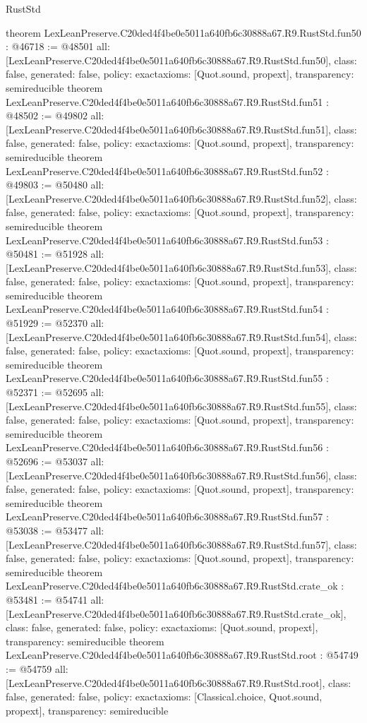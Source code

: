 \begin{lexlean}{RustStd}
\begin{coremodule}
{}
theorem LexLeanPreserve.C20ded4f4be0e5011a640fb6c30888a67.R9.RustStd.fun50 : @46718 := @48501 {
  all: [LexLeanPreserve.C20ded4f4be0e5011a640fb6c30888a67.R9.RustStd.fun50],
  class: false,
  generated: false,
  policy: exact{axioms: [Quot.sound, propext]},
  transparency: semireducible
}
theorem LexLeanPreserve.C20ded4f4be0e5011a640fb6c30888a67.R9.RustStd.fun51 : @48502 := @49802 {
  all: [LexLeanPreserve.C20ded4f4be0e5011a640fb6c30888a67.R9.RustStd.fun51],
  class: false,
  generated: false,
  policy: exact{axioms: [Quot.sound, propext]},
  transparency: semireducible
}
theorem LexLeanPreserve.C20ded4f4be0e5011a640fb6c30888a67.R9.RustStd.fun52 : @49803 := @50480 {
  all: [LexLeanPreserve.C20ded4f4be0e5011a640fb6c30888a67.R9.RustStd.fun52],
  class: false,
  generated: false,
  policy: exact{axioms: [Quot.sound, propext]},
  transparency: semireducible
}
theorem LexLeanPreserve.C20ded4f4be0e5011a640fb6c30888a67.R9.RustStd.fun53 : @50481 := @51928 {
  all: [LexLeanPreserve.C20ded4f4be0e5011a640fb6c30888a67.R9.RustStd.fun53],
  class: false,
  generated: false,
  policy: exact{axioms: [Quot.sound, propext]},
  transparency: semireducible
}
theorem LexLeanPreserve.C20ded4f4be0e5011a640fb6c30888a67.R9.RustStd.fun54 : @51929 := @52370 {
  all: [LexLeanPreserve.C20ded4f4be0e5011a640fb6c30888a67.R9.RustStd.fun54],
  class: false,
  generated: false,
  policy: exact{axioms: [Quot.sound, propext]},
  transparency: semireducible
}
theorem LexLeanPreserve.C20ded4f4be0e5011a640fb6c30888a67.R9.RustStd.fun55 : @52371 := @52695 {
  all: [LexLeanPreserve.C20ded4f4be0e5011a640fb6c30888a67.R9.RustStd.fun55],
  class: false,
  generated: false,
  policy: exact{axioms: [Quot.sound, propext]},
  transparency: semireducible
}
theorem LexLeanPreserve.C20ded4f4be0e5011a640fb6c30888a67.R9.RustStd.fun56 : @52696 := @53037 {
  all: [LexLeanPreserve.C20ded4f4be0e5011a640fb6c30888a67.R9.RustStd.fun56],
  class: false,
  generated: false,
  policy: exact{axioms: [Quot.sound, propext]},
  transparency: semireducible
}
theorem LexLeanPreserve.C20ded4f4be0e5011a640fb6c30888a67.R9.RustStd.fun57 : @53038 := @53477 {
  all: [LexLeanPreserve.C20ded4f4be0e5011a640fb6c30888a67.R9.RustStd.fun57],
  class: false,
  generated: false,
  policy: exact{axioms: [Quot.sound, propext]},
  transparency: semireducible
}
theorem LexLeanPreserve.C20ded4f4be0e5011a640fb6c30888a67.R9.RustStd.crate_ok : @53481 := @54741 {
  all: [LexLeanPreserve.C20ded4f4be0e5011a640fb6c30888a67.R9.RustStd.crate_ok],
  class: false,
  generated: false,
  policy: exact{axioms: [Quot.sound, propext]},
  transparency: semireducible
}
theorem LexLeanPreserve.C20ded4f4be0e5011a640fb6c30888a67.R9.RustStd.root : @54749 := @54759 {
  all: [LexLeanPreserve.C20ded4f4be0e5011a640fb6c30888a67.R9.RustStd.root],
  class: false,
  generated: false,
  policy: exact{axioms: [Classical.choice, Quot.sound, propext]},
  transparency: semireducible
}


\end{coremodule}
\end{lexlean}
